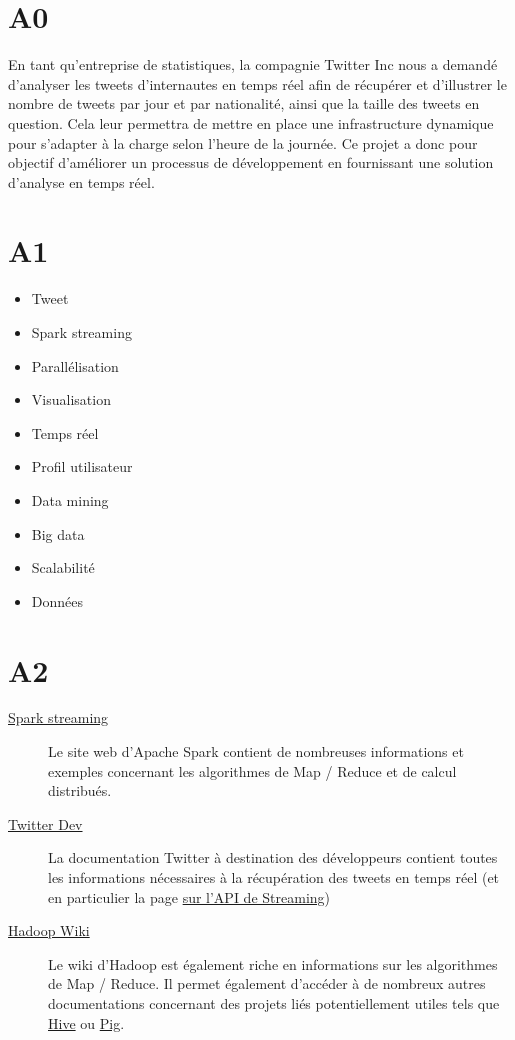 \section{A0}
  En tant qu'entreprise de statistiques, la compagnie Twitter Inc nous a demandé d'analyser les tweets d'internautes en temps réel afin de récupérer et d'illustrer le nombre de tweets par jour et par nationalité, ainsi que la taille des tweets en question. Cela leur permettra de mettre en place une infrastructure dynamique pour s'adapter à la charge selon l'heure de la journée. Ce projet a donc pour objectif d'améliorer un processus de développement en fournissant une solution d'analyse en temps réel.

\section{A1}
  \begin{itemize}
    \item Tweet
    \item Spark streaming
    \item Parallélisation
    \item Visualisation
    \item Temps réel
    \item Profil utilisateur
    \item Data mining
    \item Big data
    \item Scalabilité
    \item Données
  \end{itemize}

\section{A2}
  \begin{description}
    \item[\href{http://spark.apache.org/streaming/}{Spark streaming}] Le site web d'Apache Spark contient de nombreuses informations et exemples concernant les algorithmes de Map / Reduce et de calcul distribués.
    \item[\href{https://dev.twitter.com}{Twitter Dev}] La documentation Twitter à destination des développeurs contient toutes les informations nécessaires à la récupération des tweets en temps réel (et en particulier la page \href{https://dev.twitter.com/streaming/overview}{sur l'API de Streaming})
    \item[\href{http://wiki.apache.org/hadoop}{Hadoop Wiki}] Le wiki d'Hadoop est également riche en informations sur les algorithmes de Map / Reduce. Il permet également d'accéder à de nombreux autres documentations concernant des projets liés potentiellement utiles tels que \href{https://cwiki.apache.org/confluence/display/Hive/Home}{Hive} ou \href{https://cwiki.apache.org/confluence/display/PIG/Index}{Pig}.
  \end{description}

